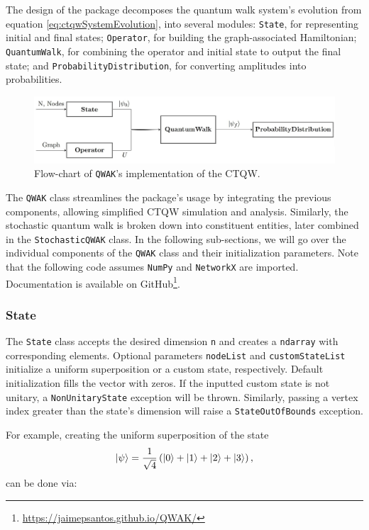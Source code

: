 \documentclass[main.tex]{subfiles}
\begin{document}
The design of the package decomposes the quantum walk system's evolution from
equation \eqref{eq:ctqwSystemEvolution}, into several modules: \texttt{State},
for representing initial and final states; \texttt{Operator}, for building the
graph-associated Hamiltonian; \texttt{QuantumWalk}, for combining the operator
and initial state to output the final state; and
\texttt{ProbabilityDistribution}, for converting amplitudes into probabilities.

\begin{figure}[!h]
    \centering
    \includegraphics[width=12cm]{qwakDiagram.jpg}
    \caption{Flow-chart of \texttt{QWAK}'s implementation of the CTQW.}
    \label{fig:oriented_line}
\end{figure}

The \texttt{QWAK} class streamlines the package's usage by integrating the
previous components, allowing simplified CTQW simulation and analysis.
Similarly, the stochastic quantum walk is broken down into constituent
entities, later combined in the \texttt{StochasticQWAK} class. In the following
sub-sections, we will go over the individual components of the \texttt{QWAK}
class and their initialization parameters. Note that the following code assumes
\texttt{NumPy} and \texttt{NetworkX} are imported. Documentation is available
on GitHub\footnote{\url{https://jaimepsantos.github.io/QWAK/}}.

\subsubsection{State}

The \texttt{State} class accepts the desired dimension \texttt{n} and creates a
\texttt{ndarray} with corresponding elements. Optional parameters
\texttt{nodeList} and \texttt{customStateList} initialize a uniform
superposition or a custom state, respectively. Default initialization fills
the vector with zeros. If the inputted custom state is not unitary, a
\texttt{NonUnitaryState} exception will be thrown. Similarly, passing a vertex index
greater than the state's dimension will raise a \texttt{StateOutOfBounds}
exception.

For example, creating the uniform superposition of the state
\begin{equation}
    \ket{\psi} = \frac{1}{\sqrt{4}}\left( \ket{0} + \ket{1} +\ket{2} +\ket{3}\right),
\end{equation}
can be done via:
\end{document}
